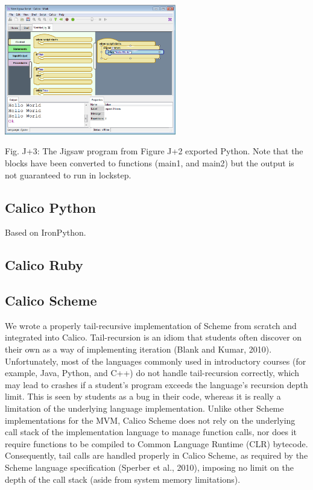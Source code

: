 \documentclass[preprint]{sigplanconf}
\begin{document}
\includegraphics[width=75mm]{jigsaw1.eps} 

Fig. J+3: The Jigsaw program from Figure J+2 exported Python. Note
that the blocks have been converted to functions (main1, and main2)
but the output is not guaranteed to run in lockstep.

\subsection{Calico Python}

Based on IronPython. 

\subsection{Calico Ruby}

\subsection{Calico Scheme}

We wrote a properly tail-recursive implementation of Scheme from
scratch and integrated into Calico.  Tail-recursion is an idiom that
students often discover on their own as a way of implementing
iteration (Blank and Kumar, 2010). Unfortunately, most of the
languages commonly used in introductory courses (for example, Java,
Python, and C++) do not handle tail-recursion correctly, which may
lead to crashes if a student’s program exceeds the language’s
recursion depth limit. This is seen by students as a bug in their
code, whereas it is really a limitation of the underlying language
implementation. Unlike other Scheme implementations for the MVM,
Calico Scheme does not rely on the underlying call stack of the
implementation language to manage function calls, nor does it require
functions to be compiled to Common Language Runtime (CLR)
bytecode. Consequently, tail calls are handled properly in Calico
Scheme, as required by the Scheme language specification (Sperber et
al., 2010), imposing no limit on the depth of the call stack (aside
from system memory limitations).
\end{document}
